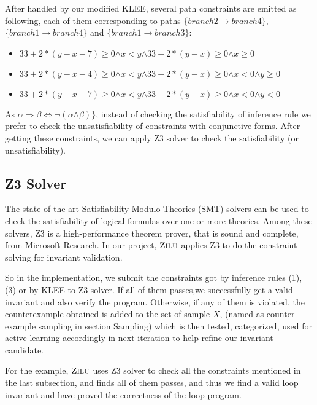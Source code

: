 After handled by our modified KLEE,
several path constraints are emitted as following, each of them corresponding to paths 
$\{branch2 \to branch4\}$, $\{branch1 \to branch4\}$ and $\{branch1 \to branch3\}$:


\begin{itemize}
\item $33+2*(y-x-7)\ge0 \boldsymbol{\wedge} x<y \boldsymbol{\wedge} 33+2*(y-x)\ge0 \boldsymbol{\wedge} x\ge0$
\item $33+2*(y-x-4)\ge0 \boldsymbol{\wedge} x<y \boldsymbol{\wedge} 33+2*(y-x)\ge0 \boldsymbol{\wedge} x<0 \boldsymbol{\wedge} y\ge0$
\item $33+2*(y-x-7)\ge0 \boldsymbol{\wedge} x<y \boldsymbol{\wedge} 33+2*(y-x)\ge0 \boldsymbol{\wedge} x<0 \boldsymbol{\wedge} y<0$
\end{itemize}
As $\alpha \Rightarrow \beta \Longleftrightarrow \neg (\alpha \boldsymbol{\wedge} \beta)\}$, 
instead of checking the satisfiability of inference rule
we prefer to check the unsatisfiability of constraints with conjunctive forms. 
After getting these constraints, we can apply Z3 solver to check the satisfiability (or unsatisfiability).

\subsection{Z3 Solver}
The state-of-the art Satisfiability Modulo Theories (SMT) solvers can be used to check the satisfiability of logical formulas over one or more theories. 
Among these solvers, Z3 is a high-performance theorem prover, that is sound and complete, from Microsoft Research.
In our project, $\textsc{Zilu}$ applies Z3 to do the constraint solving for invariant validation. 

So in the implementation, we submit the constraints got by inference rules (1), (3) or by KLEE to Z3 solver.
If all of them passes,we successfully get a valid invariant and also verify the program. 
Otherwise, if any of them is violated, the counterexample obtained is added to the set of sample $X$, 
(named as counter-example sampling in section Sampling)
which is then tested, categorized, used for active learning accordingly in next iteration to help refine our invariant candidate.

For the example, $\textsc{Zilu}$ uses Z3 solver to check all the constraints mentioned in the last subsection,
and finds all of them passes, and thus we find a valid loop invariant and have proved the correctness of the loop program.

